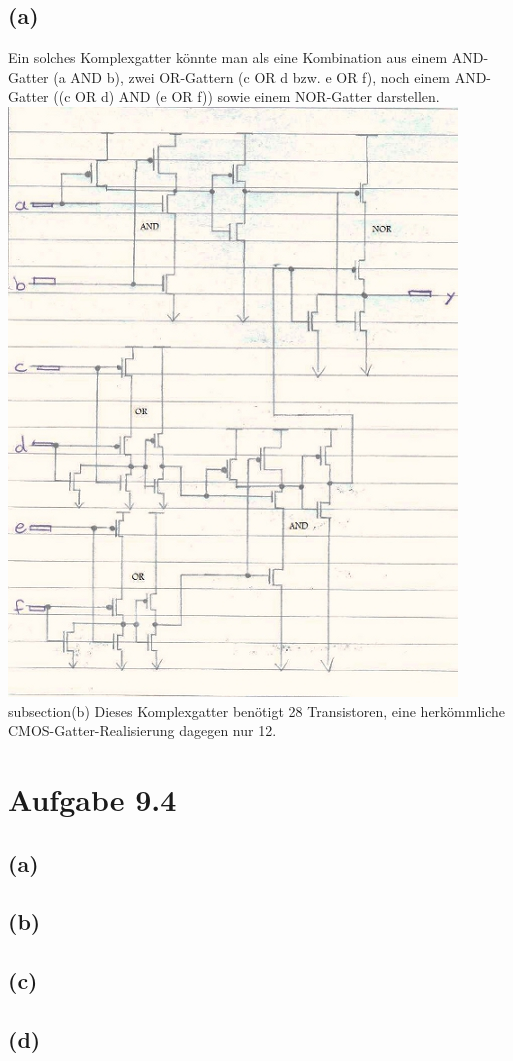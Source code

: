 \documentclass[12pt]{article}
\begin{document}
\subsection{(a)}
Ein solches Komplexgatter könnte man als eine Kombination aus einem
AND-Gatter (a AND b), zwei OR-Gattern (c OR d bzw. e OR f), noch
einem AND-Gatter ((c OR d) AND (e OR f)) sowie einem NOR-Gatter
darstellen.
\includegraphics{Schaltskizze93a}
subsection{(b)}
Dieses Komplexgatter benötigt 28 Transistoren, eine herkömmliche CMOS-Gatter-Realisierung dagegen nur 12.

\section{Aufgabe 9.4}
\subsection{(a)}
\subsection{(b)}
\subsection{(c)}
\subsection{(d)}
\end{document}
